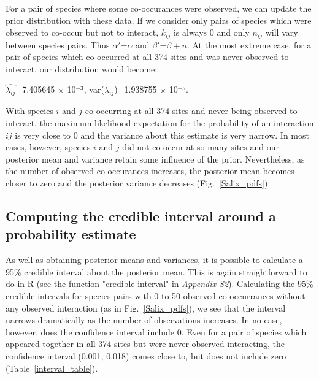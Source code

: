 ﻿\documentclass[12pt]{article}
\begin{document}
      For a pair of species where some co-occurances were observed, we can update the prior distribution with these data. If we consider only pairs of species which were observed to co-occur but not to interact, $k_{ij}$ is always 0 and only $n_{ij}$ will vary between species pairs. Thus $\alpha'$=$\alpha$ and $\beta'$=$\beta + n$. At the most extreme case, for a pair of species which co-occurred at all 374 sites and was never observed to interact, our distribution would become:


      $\hat{\lambda_{ij}}$=7.405645 $\times$ 10$^{-3}$, var($\lambda_{ij}$)=1.938755 $\times$ 10$^{-5}$.
      
      With species $i$ and $j$ co-occurring at all 374 sites and never being observed to interact, the maximum likelihood expectation for the probability of an interaction $ij$ is very close to 0 and the variance about this estimate is very narrow. In most cases, however, species $i$ and $j$ did not co-occur at so many sites and our posterior mean and variance retain some influence of the prior. Nevertheless, as the number of observed co-occurances increases, the posterior mean becomes closer to zero and the posterior variance decreases (Fig.~\ref{Salix_pdfs}).


  \subsection*{Computing the credible interval around a probability estimate}

      As well as obtaining posterior means and variances, it is possible to calculate a 95\% credible interval about the posterior mean. This is again straightforward to do in R (see the function "credible interval" in \emph{Appendix S2}). Calculating the 95\% credible intervals for species pairs with 0 to 50 observed co-occurrances without any observed interaction (as in Fig.~\ref{Salix_pdfs}), we see that the interval narrows dramatically as the number of observations increases. In no case, however, does the confidence interval include 0. Even for a pair of species which appeared together in all 374 sites but were never observed interacting, the confidence interval (0.001, 0.018) comes close to, but does not include zero (Table~\ref{interval_table}). 
\end{document}
